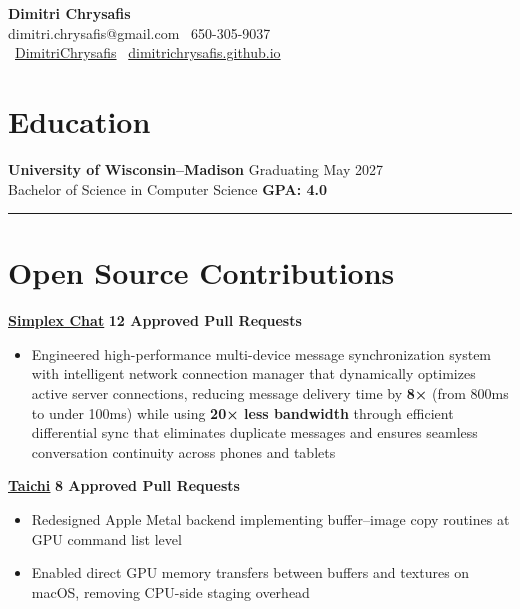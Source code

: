 \documentclass[11pt]{article}
\begin{document}
\begin{center}
\textbf{\Large Dimitri Chrysafis}\\[2pt]
dimitri.chrysafis@gmail.com \textbullet \ 650-305-9037\\
\faGithub \ \href{https://github.com/DimitriChrysafis}{DimitriChrysafis} \textbullet \ \href{https://dimitrichrysafis.github.io/}{dimitrichrysafis.github.io}
\end{center}

\vspace{1pt}

\section*{\textcolor{modernblue}{\Large Education}}
\textbf{University of Wisconsin–Madison} \hfill Graduating May 2027\\
Bachelor of Science in Computer Science \hfill \textcolor{accentgreen}{\textbf{GPA: 4.0}}

\noindent\rule{\textwidth}{0.5pt}

\section*{\textcolor{modernblue}{\Large Open Source Contributions}}
\textbf{\href{https://simplex.chat/}{\underline{Simplex Chat}}} \hfill \textcolor{modernblue}{\textbf{12 Approved Pull Requests}}
\begin{itemize}[leftmargin=*, topsep=0pt, itemsep=0pt, parsep=0pt]
\item Engineered high-performance multi-device message synchronization system with intelligent network connection manager that dynamically optimizes active server connections, reducing message delivery time by \textbf{8×} (from 800ms to under 100ms) while using \textbf{20× less bandwidth} through efficient differential sync that eliminates duplicate messages and ensures seamless conversation continuity across phones and tablets
\end{itemize}
\vspace{1pt}
\noindent\textbf{\href{https://www.taichi-lang.org/}{\underline{Taichi}}} \hfill \textcolor{modernblue}{\textbf{8 Approved Pull Requests}}
\begin{itemize}[leftmargin=*, topsep=0pt, itemsep=0pt, parsep=0pt]
\item Redesigned Apple Metal backend implementing buffer–image copy routines at GPU command list level
\item Enabled direct GPU memory transfers between buffers and textures on macOS, removing CPU-side staging overhead
\end{itemize}
\end{document}
